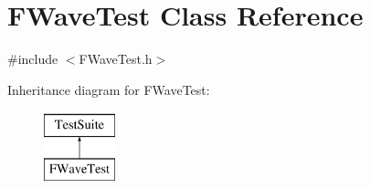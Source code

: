 \hypertarget{classFWaveTest}{}\section{F\+Wave\+Test Class Reference}
\label{classFWaveTest}


{\ttfamily \#include $<$F\+Wave\+Test.\+h$>$}

Inheritance diagram for F\+Wave\+Test\+:\begin{figure}[H]
\begin{center}
\leavevmode
\includegraphics[height=2.000000cm]{classFWaveTest}
\end{center}
\end{figure}
